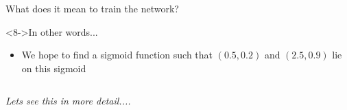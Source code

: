 \documentclass[aspectratio=169]{beamer}
\begin{document}
\begin{frame}
\begin{columns}
\begin{overlayarea}{\textwidth}{\textheight}
{\begin{block}{What does it mean to train the network?}
\end{block}

\begin{block}<8->{In other words...}
\begin{itemize}
    \item We hope to find a sigmoid function such that $(0.5, 0.2)$ and $(2.5, 0.9)$ lie on this sigmoid
\end{itemize}
\end{block}

}
\end{overlayarea}
\end{columns}
\end{frame}

\begin{frame}
\fontsize{16pt}{7.2}\selectfont
 \textit{Lets see this in more detail....}
\end{frame}
\end{document}
